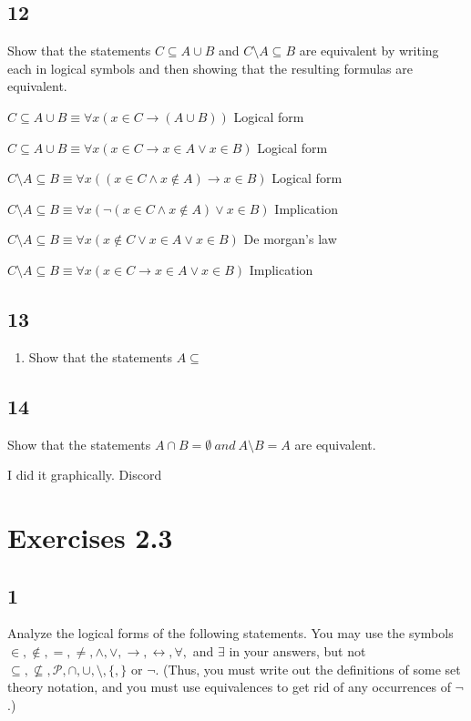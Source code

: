 \documentclass{article}
\begin{document}
\subsection{12}
Show that the statements $C \subseteq A \cup B$ and $C \setminus A \subseteq B$ are equivalent by writing each in logical symbols and then showing that the resulting formulas are equivalent.

$C \subseteq A \cup B \equiv \forall x(x \in C \rightarrow (A \cup B))$ Logical form

\underline{$C \subseteq A \cup B \equiv \forall x(x \in C \rightarrow  x \in A \lor x \in B)$} Logical form

$C \setminus A \subseteq B \equiv \forall x ((x \in C \land x \notin A) \rightarrow x \in B)$ Logical form

$C \setminus A \subseteq B \equiv \forall x (\neg (x \in C \land x \notin A) \lor x \in B)$ Implication

$C \setminus A \subseteq B \equiv \forall x (x \notin C \lor x \in A \lor x \in B)$ De morgan's law

\underline{$C \setminus A \subseteq B \equiv \forall x (x \in C \rightarrow x \in A \lor x \in B)$} Implication
\subsection{13}
\begin{enumerate}
    \item Show that the statements $A \subseteq $
\end{enumerate}
\subsection{14}
Show that the statements $A \cap B = \emptyset \ and  \ A \setminus B = A$ are equivalent.

I did it graphically. Discord

\newpage
\section{Exercises 2.3}
\subsection{1}
Analyze the logical forms of the following statements. You may use the symbols $\in, \notin, =, \neq , \land, \lor , \rightarrow, \leftrightarrow, \forall,$ and $\exists$ in your answers, but not $\subseteq, \nsubseteq, \mathscr{P} , \cap, \cup, \setminus, \{,\}$ or $\neg$. (Thus, you must write out the definitions of some set theory notation, and you must use equivalences to get rid of any occurrences of $\neg$.)
\end{document}
